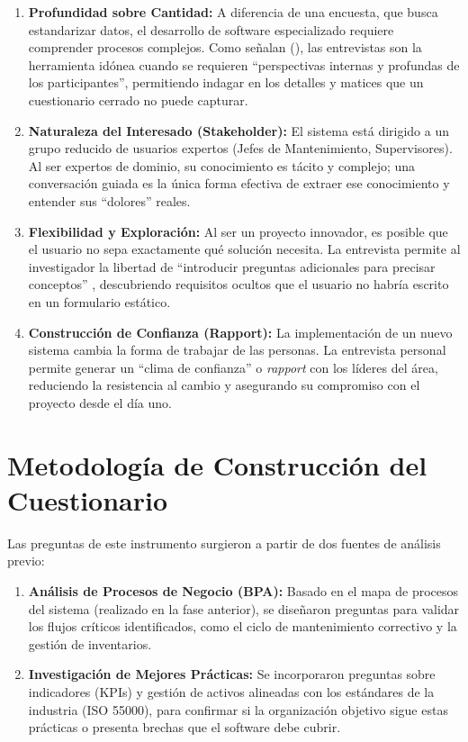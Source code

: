 \documentclass[12pt, a4paper]{article}
\begin{document}
\begin{enumerate}
    \item \textbf{Profundidad sobre Cantidad:} A diferencia de una encuesta, que busca estandarizar datos, el desarrollo de software especializado requiere comprender procesos complejos. Como señalan \citeauthor{sampieri:2018} (\citeyear{sampieri:2018}), las entrevistas son la herramienta idónea cuando se requieren ``perspectivas internas y profundas de los participantes'', permitiendo indagar en los detalles y matices que un cuestionario cerrado no puede capturar.
    \item \textbf{Naturaleza del Interesado (Stakeholder):} El sistema está dirigido a un grupo reducido de usuarios expertos (Jefes de Mantenimiento, Supervisores). Al ser expertos de dominio, su conocimiento es tácito y complejo; una conversación guiada es la única forma efectiva de extraer ese conocimiento y entender sus ``dolores'' reales.
    \item \textbf{Flexibilidad y Exploración:} Al ser un proyecto innovador, es posible que el usuario no sepa exactamente qué solución necesita. La entrevista permite al investigador la libertad de ``introducir preguntas adicionales para precisar conceptos'' \parencite{sampieri:2018}, descubriendo requisitos ocultos que el usuario no habría escrito en un formulario estático.
    \item \textbf{Construcción de Confianza (Rapport):} La implementación de un nuevo sistema cambia la forma de trabajar de las personas. La entrevista personal permite generar un ``clima de confianza'' o \textit{rapport} con los líderes del área, reduciendo la resistencia al cambio y asegurando su compromiso con el proyecto desde el día uno.
\end{enumerate}

\section{Metodología de Construcción del Cuestionario}
Las preguntas de este instrumento surgieron a partir de dos fuentes de análisis previo:
\begin{enumerate}
    \item \textbf{Análisis de Procesos de Negocio (BPA):} Basado en el mapa de procesos del sistema (realizado en la fase anterior), se diseñaron preguntas para validar los flujos críticos identificados, como el ciclo de mantenimiento correctivo y la gestión de inventarios.
    \item \textbf{Investigación de Mejores Prácticas:} Se incorporaron preguntas sobre indicadores (KPIs) y gestión de activos alineadas con los estándares de la industria (ISO 55000), para confirmar si la organización objetivo sigue estas prácticas o presenta brechas que el software debe cubrir.
\end{enumerate}
\end{document}
